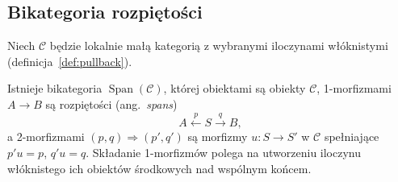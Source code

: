 \subsection{Bikategoria rozpiętości}

Niech $\mathcal C$ będzie lokalnie małą kategorią z wybranymi iloczynami włóknistymi (definicja~\ref{def:pullback}).

\begin{twierdzenie}\label{cat:thm:span-bicategory}
Istnieje bikategoria $\operatorname{Span}(\mathcal C)$, której obiektami są obiekty $\mathcal C$, 1-morfizmami $A\to B$ są rozpiętości (ang.\ \emph{spans})
\[
 A\xleftarrow{p}S\xrightarrow{q}B,
\]
a 2-morfizmami $(p,q)\Rightarrow(p',q')$ są morfizmy $u:S\to S'$ w $\mathcal C$ spełniające $p'u=p$, $q'u=q$. Składanie 1-morfizmów polega na utworzeniu iloczynu włóknistego ich obiektów środkowych nad wspólnym końcem.
\end{twierdzenie}
